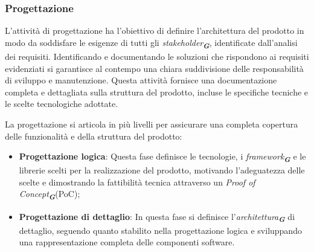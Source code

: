 \subsubsection{Progettazione}

L'attività di progettazione ha l'obiettivo di definire l'architettura del prodotto in modo da soddisfare le esigenze di tutti gli \emph{stakeholder}\textsubscript{\textit{\textbf{G}}}, identificate dall’analisi dei requisiti. Identificando e documentando le soluzioni che rispondono ai requisiti evidenziati si garantisce al contempo una chiara suddivisione delle responsabilità di sviluppo e manutenzione. Questa attività fornisce una documentazione completa e dettagliata sulla struttura del prodotto, incluse le specifiche tecniche e le scelte tecnologiche adottate. 

La progettazione si articola in più livelli per assicurare una completa copertura delle funzionalità e della struttura del prodotto:
\begin{itemize}
    \item \textbf{Progettazione logica}: Questa fase definisce le tecnologie, i \emph{framework}\textsubscript{\textit{\textbf{G}}} e le librerie scelti per la realizzazione del prodotto, motivando l'adeguatezza delle scelte e dimostrando la fattibilità tecnica attraverso un \emph{Proof of Concept}\textsubscript{\textit{\textbf{G}}}(PoC);
    \item \textbf{Progettazione di dettaglio}: In questa fase si definisce l'\emph{architettura}\textsubscript{\textit{\textbf{G}}} di dettaglio, seguendo quanto stabilito nella progettazione logica e sviluppando una rappresentazione completa delle componenti software.
\end{itemize}

